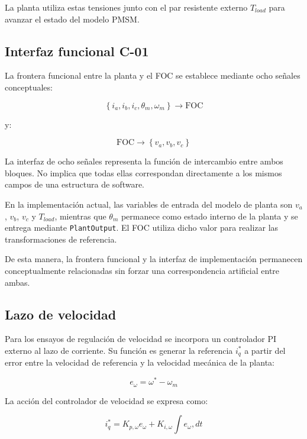 La planta utiliza estas tensiones junto con el par resistente externo $T_{load}$ para avanzar el estado del modelo PMSM.

\subsection{Interfaz funcional C-01}

La frontera funcional entre la planta y el FOC se establece mediante ocho señales conceptuales:

\begin{equation}
\left\{
i_a,i_b,i_c,\theta_m,\omega_m
\right\}
\longrightarrow
\mathrm{FOC}
\end{equation}

y:

\begin{equation}
\mathrm{FOC}
\longrightarrow
\left\{
v_a,v_b,v_c
\right\}
\end{equation}

La interfaz de ocho señales representa la función de intercambio entre ambos bloques. No implica que todas ellas correspondan directamente a los mismos campos de una estructura de software.

En la implementación actual, las variables de entrada del modelo de planta son $v_a$, $v_b$, $v_c$ y $T_{load}$, mientras que $\theta_m$ permanece como estado interno de la planta y se entrega mediante \texttt{PlantOutput}. El FOC utiliza dicho valor para realizar las transformaciones de referencia.

De esta manera, la frontera funcional y la interfaz de implementación permanecen conceptualmente relacionadas sin forzar una correspondencia artificial entre ambas.

\subsection{Lazo de velocidad}

Para los ensayos de regulación de velocidad se incorpora un controlador PI externo al lazo de corriente. Su función es generar la referencia $i_q^{*}$ a partir del error entre la velocidad de referencia y la velocidad mecánica de la planta:

\begin{equation}
e_{\omega}=\omega^{*}-\omega_m
\end{equation}

La acción del controlador de velocidad se expresa como:

\begin{equation}
i_q^{*}=K_{p,\omega}e_{\omega}
+
K_{i,\omega}\int e_{\omega},dt
\end{equation}

